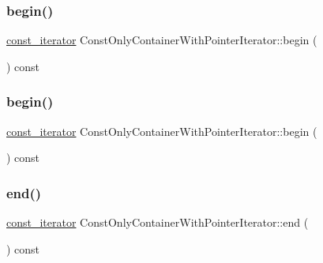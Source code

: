 \subsubsection{\texorpdfstring{begin()}{begin()}\hspace{0.1cm}{\footnotesize\ttfamily [1/2]}}
{\footnotesize\ttfamily \mbox{\hyperlink{struct_const_only_container_with_pointer_iterator_a652efbd2c6da61e65cc45123e4182713}{const\+\_\+iterator}} Const\+Only\+Container\+With\+Pointer\+Iterator\+::begin (\begin{DoxyParamCaption}{ }\end{DoxyParamCaption}) const}

\mbox{\label{struct_const_only_container_with_pointer_iterator_a3dd48a5028ca3c3bed0a10d7c5fa938b}} 
\subsubsection{\texorpdfstring{begin()}{begin()}\hspace{0.1cm}{\footnotesize\ttfamily [2/2]}}
{\footnotesize\ttfamily \mbox{\hyperlink{struct_const_only_container_with_pointer_iterator_a652efbd2c6da61e65cc45123e4182713}{const\+\_\+iterator}} Const\+Only\+Container\+With\+Pointer\+Iterator\+::begin (\begin{DoxyParamCaption}{ }\end{DoxyParamCaption}) const}

\mbox{\label{struct_const_only_container_with_pointer_iterator_a041683280e1319a08467fa9035098cff}} 
\subsubsection{\texorpdfstring{end()}{end()}\hspace{0.1cm}{\footnotesize\ttfamily [1/2]}}
{\footnotesize\ttfamily \mbox{\hyperlink{struct_const_only_container_with_pointer_iterator_a652efbd2c6da61e65cc45123e4182713}{const\+\_\+iterator}} Const\+Only\+Container\+With\+Pointer\+Iterator\+::end (\begin{DoxyParamCaption}{ }\end{DoxyParamCaption}) const}

